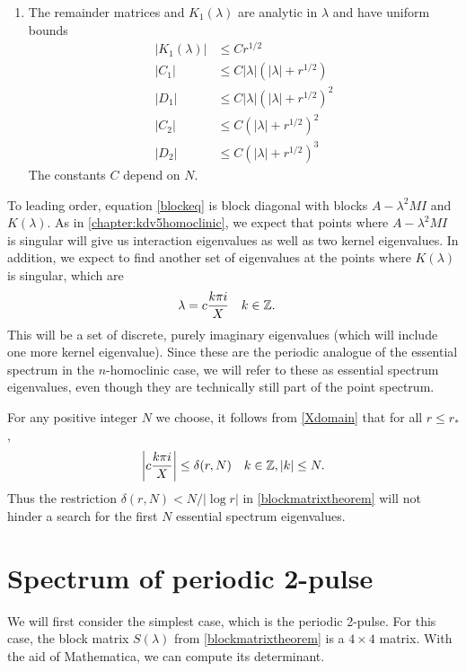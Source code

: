 \documentclass[thesis.tex]{subfiles}
\begin{document}
\begin{theorem}
\begin{enumerate}
\item The remainder matrices and $K_1(\lambda)$ are analytic in $\lambda$ and have uniform bounds
\begin{align*}
|K_1(\lambda)| &\leq C r^{1/2} \\
|C_1| &\leq C |\lambda|(|\lambda| + r^{1/2}) \\
|D_1| &\leq C |\lambda|(|\lambda| + r^{1/2})^2 \\
|C_2| &\leq C (|\lambda| + r^{1/2})^2 \\
|D_2| &\leq C (|\lambda| + r^{1/2})^3 
\end{align*}
The constants $C$ depend on $N$.
\end{enumerate}
\end{theorem}

To leading order, equation \cref{blockeq} is block diagonal with blocks $A - \lambda^2 MI$ and $K(\lambda)$. As in \cref{chapter:kdv5homoclinic}, we expect that points where $A - \lambda^2 MI$ is singular will give us interaction eigenvalues as well as two kernel eigenvalues. In addition, we expect to find another set of eigenvalues at the points where $K(\lambda)$ is singular, which are
\begin{align*}
\lambda &= c\frac{k \pi i}{X} && k \in \mathbb{Z}.
\end{align*}
This will be a set of discrete, purely imaginary eigenvalues (which will include one more kernel eigenvalue). Since these are the periodic analogue of the essential spectrum in the $n$-homoclinic case, we will refer to these as essential spectrum eigenvalues, even though they are technically still part of the point spectrum. 

\begin{remark}
For any positive integer $N$ we choose, it follows from \cref{Xdomain} that for all $r \leq r_*$,
\begin{align*}
\left| c\frac{k \pi i}{X} \right| \leq \delta(r,N) && k \in \mathbb{Z}, |k|\leq N.
\end{align*}
Thus the restriction $\delta(r,N) < N/|\log r|$ in \cref{blockmatrixtheorem} will not hinder a search for the first $N$ essential spectrum eigenvalues.
\end{remark}

\section{Spectrum of periodic 2-pulse}

We will first consider the simplest case, which is the periodic 2-pulse. For this case, the block matrix  $S(\lambda)$ from \cref{blockmatrixtheorem} is a $4\times4$ matrix. With the aid of Mathematica, we can compute its determinant.
\end{document}
